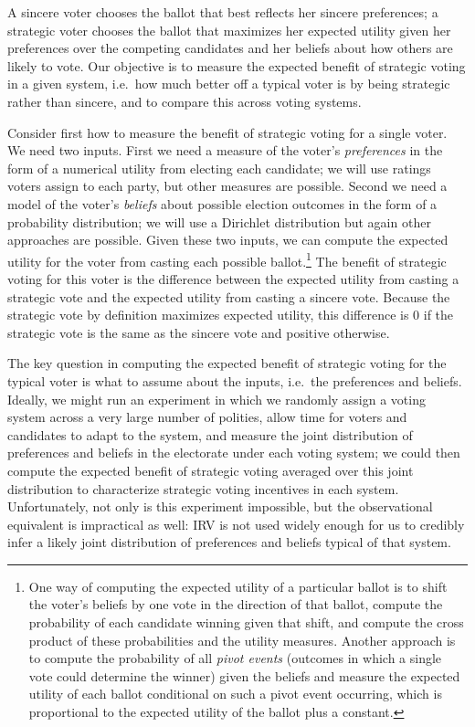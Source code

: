 \documentclass[11pt,a4paper]{article}
\begin{document}
A sincere voter chooses the ballot that best reflects her sincere preferences; a strategic voter chooses the ballot that maximizes her expected utility given her preferences over the competing candidates and her beliefs about how others are likely to vote. Our objective is to measure the expected benefit of strategic voting in a given system, i.e.\ how much better off a typical voter is by being strategic rather than sincere, and to compare this across voting systems. %

Consider first how to measure the benefit of strategic voting for a single voter. We need two inputs. First we need a measure of the voter's \emph{preferences} in the form of a numerical utility from electing each candidate; we will use ratings voters assign to each party, but other measures are possible. Second we need a model of the voter's \emph{beliefs} about possible election outcomes in the form of a probability distribution; we will use a Dirichlet distribution but again other approaches are possible. Given these two inputs, we can compute the expected utility for the voter from casting each possible ballot.\footnote{One way of computing the expected utility of a particular ballot is to shift the voter's beliefs by one vote in the direction of that ballot, compute the probability of each candidate winning given that shift, and compute the cross product of these probabilities and the utility measures. Another approach is to compute the probability of all \emph{pivot events} (outcomes in which a single vote could determine the winner) given the beliefs and measure the expected utility of each ballot conditional on such a pivot event occurring, which is proportional to the expected utility of the ballot plus a constant.} The benefit of strategic voting for this voter is the difference between the expected utility from casting a strategic vote and the expected utility from casting a sincere vote. Because the strategic vote by definition maximizes expected utility, this difference is 0 if the strategic vote is the same as the sincere vote and positive otherwise.

The key question in computing the expected benefit of strategic voting for the typical voter is what to assume about the inputs, i.e.\ the preferences and beliefs. Ideally, we might run an experiment in which we randomly assign a voting system across a very large number of polities, allow time for voters and candidates to adapt to the system, and measure the joint distribution of preferences and beliefs in the electorate under each voting system; we could then compute the expected benefit of strategic voting averaged over this joint distribution to characterize strategic voting incentives in each system. Unfortunately, not only is this experiment impossible, but the observational equivalent is impractical as well: IRV is not used widely enough for us to credibly infer a likely joint distribution of preferences and beliefs typical of that system. 
\end{document}
